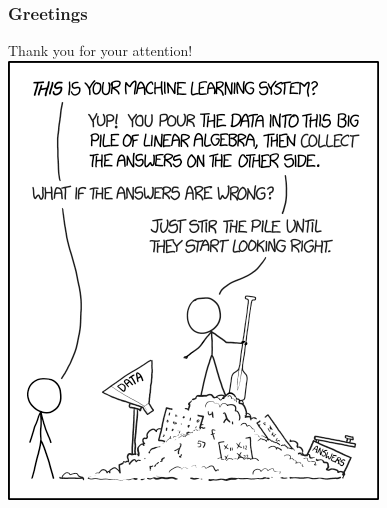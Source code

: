 \documentclass{beamer}
\begin{document}
\begin{frame}
	\frametitle{Greetings}
	\center Thank you for your attention!
	\center \includegraphics[scale = 0.35]{xkcdml.png}
\end{frame}

\end{document}
